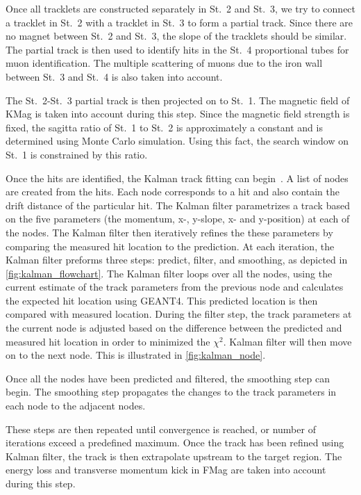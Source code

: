 \documentclass[../main.tex]{subfiles}
\begin{document}
Once all tracklets are constructed separately in St.~2 and St.~3, we try to connect a tracklet
in St.~2 with a tracklet in St.~3 to form a partial track. Since there are no magnet between
St.~2 and St.~3, the slope of the tracklets should be similar. The partial track is then used to
identify hits in the St.~4 proportional tubes for muon identification. The multiple scattering of
muons due to the iron wall between St.~3 and St.~4 is also taken into account.

The St.~2-St.~3 partial track is then projected on to St.~1. The magnetic field of KMag is taken into
account during this step. Since the magnetic field strength is fixed, the sagitta ratio of St.~1 to
St.~2 is approximately a constant and is determined using Monte Carlo simulation. Using this fact,
the search window on St.~1 is constrained by this ratio.

Once the hits are identified, the Kalman track fitting can begin~\cite{kalman1960}. A list of nodes are created
from the hits. Each node corresponds to a hit and also contain the drift distance of the particular hit.
The Kalman filter parametrizes a track based on the five parameters (the momentum, x-, y-slope, x- and y-position)
at each of the nodes.
The Kalman filter then iteratively refines the these parameters by comparing the measured hit location
to the prediction. At each iteration, the Kalman filter preforms three steps: predict, filter, and smoothing,
as depicted in \cref{fig:kalman_flowchart}.
The Kalman filter loops over all the nodes, using the current estimate of the track parameters
from the previous node and calculates the expected hit location using GEANT4. This predicted location
is then compared with measured location. During the filter step, the track parameters at the current node is
adjusted based on the difference between the predicted and measured hit location in order to minimized
the $\chi^2$. Kalman filter will then move on to the next node. This is illustrated in \cref{fig:kalman_node}.

Once all the nodes have been predicted and filtered, the smoothing step can begin. The smoothing step propagates
the changes to the track parameters in each node to the adjacent nodes.

These steps are then repeated until convergence is reached, or number of iterations exceed a predefined
maximum.
Once the track has been refined using Kalman filter, the track is then extrapolate upstream to the target
region. The energy loss and transverse momentum kick in FMag are taken into account during this step.
\end{document}
